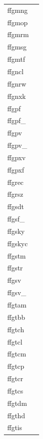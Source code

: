 \documentclass[11pt]{book}
\begin{document}
\begin{tabular}{lr}
ffgmng  & \pageref{ffgmng} \\
ffgmop    & \pageref{ffgmop} \\
ffgmrm   & \pageref{ffgmrm} \\
ffgmsg    & \pageref{ffgmsg} \\
ffgmtf  & \pageref{ffgmtf} \\
ffgncl     & \pageref{ffgnrw} \\
ffgnrw     & \pageref{ffgnrw} \\
ffgnxk      & \pageref{ffgnxk} \\
ffgpf & \pageref{ffgpf} \\
ffgpf\_ & \pageref{ffgpfx} \\
ffgpv         & \pageref{ffgpv} \\
ffgpv\_     & \pageref{ffgpvx} \\
ffgpxv   & \pageref{ffgpxv} \\
ffgpxf  & \pageref{ffgpxf} \\
ffgrec       & \pageref{ffgrec} \\
ffgrsz    & \pageref{ffgrsz} \\
ffgsdt        & \pageref{ffdt2s} \\
ffgsf\_ &  \pageref{ffgsfx} \pageref{ffgsfx2} \\
ffgsky  &  \pageref{ffgsky} \\
ffgskyc  & \pageref{ffgskyc} \\
ffgstm        & \pageref{ffdt2s} \\
ffgstr         & \pageref{ffgcrd} \\
ffgsv  & \pageref{ffgsv} \\
ffgsv\_  & \pageref{ffgsvx} \pageref{ffgsvx2}\\
ffgtam & \pageref{ffgtam} \\
ffgtbb    & \pageref{ffgtbb} \\
ffgtch  & \pageref{ffgtch} \\
ffgtcl    & \pageref{ffgtcl} \\
ffgtcm & \pageref{ffgtcm} \\
ffgtcp  & \pageref{ffgtcp} \\
ffgtcr  & \pageref{ffgtcr} \\
ffgtcs & \pageref{ffgtcs} \\
ffgtdm         & \pageref{ffgtdm} \\
ffgthd & \pageref{ffgthd} \\
ffgtis  & \pageref{ffgtis} \\

\end{tabular}
\end{document}
